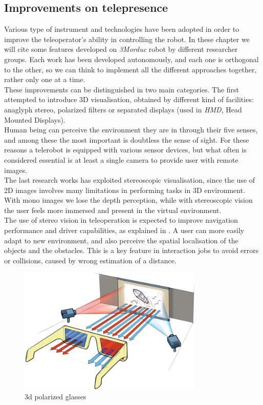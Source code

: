 \subsection{Improvements on telepresence}
\label{sec:improvements_telepresence}

Various type of instrument and technologies have been adopted in order
to improve the teleoperator's ability in controlling the robot. In
these chapter we will cite some features developed on \textit{3Morduc}
robot by different researcher groups. Each work has been developed
autonomously, and each one is orthogonal to the other, so we can think
to implement all the different approaches together, rather only one
at a time.
\\
These improvements can be distinguished in two main categories. The
first attempted to introduce 3D visualisation, obtained by different
kind of facilities: anaglyph stereo, polarized filters or separated
displays (used in \textit{HMD}, Head Mounted Displays).
\\
Human being can perceive the environment they are in through their
five senses, and among these the most important is doubtless the sense
of sight.
For these reasons a telerobot is equipped with various sensor devices,
but what often is considered essential is at least a single camera to
provide user with remote images.
\\
The last research works has exploited stereoscopic visualisation, since
the use of 2D images involves many limitations in performing tasks
in 3D environment. With mono images we lose the depth perception,
while with stereoscopic vision the user feels more immersed and
present in the virtual environment.
\\
The use of stereo vision in teleoperation is expected
to improve navigation performance and driver capabilities, as explained in
\cite{morduc:neri}. A user can more easily adapt to new environment, and
also perceive the spatial localisation of the objects and the obstacles.
This is a key feature in interaction jobs to avoid errors or collisions,
caused by wrong estimation of a distance.

\begin{figure} [!h]
  \begin{center}
    \includegraphics[width=250pt]{img/3d-glasses.png}
    \caption{3d polarized glasses}
    \label{fig:3d-glasses}
  \end{center}
\end{figure}

